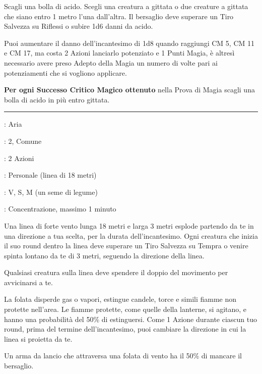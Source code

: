 \begin{multicols}{2}
Scagli una bolla di acido. Scegli una creatura a gittata o due creature a gittata che siano entro 1 metro l'una dall'altra. Il bersaglio deve superare un Tiro Salvezza su Riflessi o subire 1d6 danni da acido.

Puoi aumentare il danno dell'incantesimo di 1d8 quando raggiungi CM 5, CM 11 e CM 17, ma costa 2 Azioni lanciarlo potenziato e 1 Punti Magia, è altresì necessario avere preso Adepto della Magia un numero di volte pari ai potenziamenti che si vogliono applicare.

\textbf{Per ogni Successo Critico Magico ottenuto} nella Prova di Magia scagli una bolla di acido in più entro gittata.

\smallskip\noindent\rule{\linewidth}{2pt} \hypertarget{Folata di Vento}{}\smallskip{}
\noindent
\begin{description}[noitemsep, topsep=0pt, parsep=0pt, partopsep=0pt, leftmargin=0cm, labelwidth=2.8cm]
	\item[\textbf{Lista di Magia}]: Aria
	\item[\textbf{Livello}]: 2, Comune
	\item[\textbf{T. di Lancio}]: 2 Azioni
	\item[\textbf{Gittata}]: Personale (linea di 18 metri)
	\item[\textbf{Componenti}]: V, S, M (un seme di legume)
	\item[\textbf{Durata}]: Concentrazione, massimo 1 minuto
\end{description}

Una linea di forte vento lunga 18 metri e larga 3 metri esplode partendo da te in una direzione a tua scelta, per la durata dell'incantesimo. Ogni creatura che inizia il suo round dentro la linea deve superare un Tiro Salvezza su Tempra o venire spinta lontano da te di 3 metri, seguendo la direzione della linea.

Qualsiasi creatura sulla linea deve spendere il doppio del movimento per avvicinarsi a te.

La folata disperde gas o vapori, estingue candele, torce e simili fiamme non protette nell'area. Le fiamme protette, come quelle della lanterne, si agitano, e hanno una probabilità del 50\% di estinguersi. Come 1 Azione durante ciascun tuo round, prima del termine dell'incantesimo, puoi cambiare la direzione in cui la linea si proietta da te.

Un arma da lancio che attraversa una folata di vento ha il 50\% di mancare il bersaglio.


\end{multicols}
